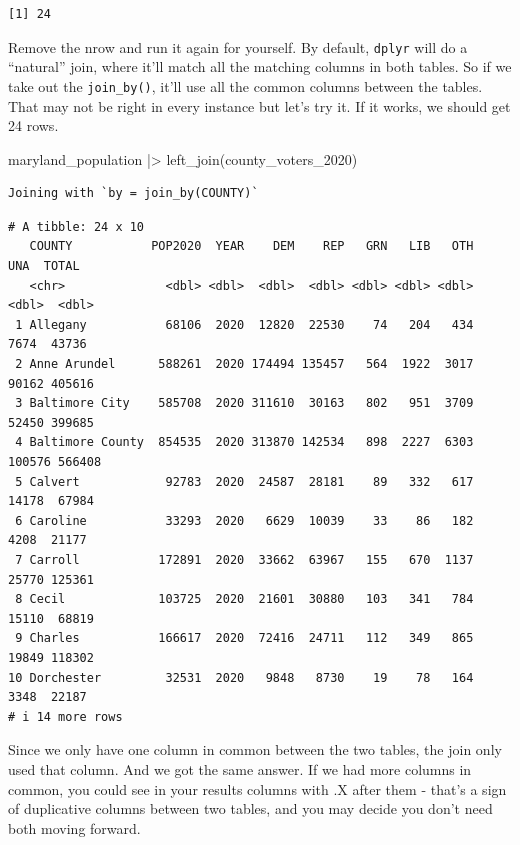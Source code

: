 \documentclass[
  letterpaper,
  DIV=11,
  numbers=noendperiod]{scrreprt}
\newenvironment{Shaded}{\begin{snugshade}}{\end{snugshade}}
\newcommand{\FunctionTok}[1]{\textcolor[rgb]{0.28,0.35,0.67}{#1}}
\newcommand{\NormalTok}[1]{\textcolor[rgb]{0.00,0.23,0.31}{#1}}
\newcommand{\SpecialCharTok}[1]{\textcolor[rgb]{0.37,0.37,0.37}{#1}}
\begin{document}
\begin{verbatim}
[1] 24
\end{verbatim}

Remove the nrow and run it again for yourself. By default,
\texttt{dplyr} will do a ``natural'' join, where it'll match all the
matching columns in both tables. So if we take out the
\texttt{join\_by()}, it'll use all the common columns between the
tables. That may not be right in every instance but let's try it. If it
works, we should get 24 rows.

\begin{Shaded}
\begin{Highlighting}[]
\NormalTok{maryland\_population }\SpecialCharTok{|\textgreater{}} \FunctionTok{left\_join}\NormalTok{(county\_voters\_2020)}
\end{Highlighting}
\end{Shaded}

\begin{verbatim}
Joining with `by = join_by(COUNTY)`
\end{verbatim}

\begin{verbatim}
# A tibble: 24 x 10
   COUNTY           POP2020  YEAR    DEM    REP   GRN   LIB   OTH    UNA  TOTAL
   <chr>              <dbl> <dbl>  <dbl>  <dbl> <dbl> <dbl> <dbl>  <dbl>  <dbl>
 1 Allegany           68106  2020  12820  22530    74   204   434   7674  43736
 2 Anne Arundel      588261  2020 174494 135457   564  1922  3017  90162 405616
 3 Baltimore City    585708  2020 311610  30163   802   951  3709  52450 399685
 4 Baltimore County  854535  2020 313870 142534   898  2227  6303 100576 566408
 5 Calvert            92783  2020  24587  28181    89   332   617  14178  67984
 6 Caroline           33293  2020   6629  10039    33    86   182   4208  21177
 7 Carroll           172891  2020  33662  63967   155   670  1137  25770 125361
 8 Cecil             103725  2020  21601  30880   103   341   784  15110  68819
 9 Charles           166617  2020  72416  24711   112   349   865  19849 118302
10 Dorchester         32531  2020   9848   8730    19    78   164   3348  22187
# i 14 more rows
\end{verbatim}

Since we only have one column in common between the two tables, the join
only used that column. And we got the same answer. If we had more
columns in common, you could see in your results columns with .X after
them - that's a sign of duplicative columns between two tables, and you
may decide you don't need both moving forward.
\end{document}
